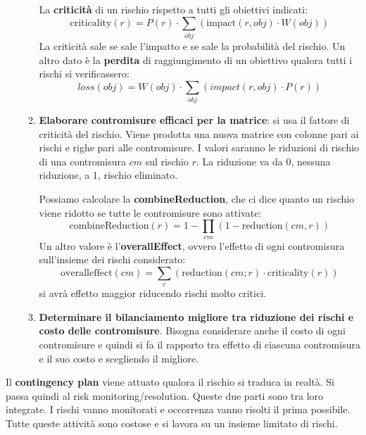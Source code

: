 \begin{enumerate}
\begin{enumerate}
                    La \textbf{criticità} di un rischio rispetto a tutti gli obiettivi indicati:
                    \begin{equation}
                        \text{criticality}(r) = P(r) \cdot \sum_{obj} (\text{impact}(r, obj) \cdot W(obj))
                    \end{equation}
                    La criticità sale se sale l'impatto e se sale la probabilità del rischio.
                    Un altro dato è la \textbf{perdita} di raggiungimento di un obiettivo
                    qualora tutti i rischi si verificassero:
                    \begin{equation}
                        loss(obj) = W(obj) \cdot \sum_{obj} (impact(r, obj) \cdot P(r))
                    \end{equation}
              \item \textbf{Elaborare contromisure efficaci per la matrice}: si usa il
                    fattore di criticità del rischio. Viene prodotta una nuova matrice con
                    colonne pari ai rischi e righe pari alle contromisure. I valori saranno
                    le riduzioni di rischio di una contromisura $cm$ sul rischio $r$. La
                    riduzione va da 0, nessuna riduzione, a 1, rischio eliminato.

                    Possiamo calcolare la \textbf{combineReduction}, che ci dice quanto un
                    rischio viene ridotto se tutte le contromisure sono attivate:
                    \begin{equation}
                        \text{combineReduction}(r) = 1 - \prod_{cm}(1 - \text{reduction}(cm, r))
                    \end{equation}
                    Un altro valore è l'\textbf{overallEffect}, ovvero l'effetto di ogni
                    contromisura sull'insieme dei rischi considerato:
                    \begin{equation}
                        \text{overalleffect}(cm) = \sum_{r} (\text{reduction}(cm; r) \cdot \text{criticality}(r))
                    \end{equation} si avrà effetto maggior riducendo rischi molto critici.
              \item \textbf{Determinare il bilanciamento migliore tra riduzione dei rischi e costo delle contromisure}.
                    Bisogna considerare anche il costo di ogni contromisure e quindi si fa il
                    rapporto tra effetto di ciascuna contromisura e il suo costo e scegliendo il migliore.
          \end{enumerate}
\end{enumerate}

Il \textbf{contingency plan} viene attuato qualora il rischio si traduca in realtà.
Si passa quindi al risk monitoring/resolution. Queste due parti sono tra loro
integrate. I rischi vanno monitorati e occorrenza vanno risolti il prima possibile.
Tutte queste attività sono costose e si lavora su un insieme limitato di rischi.